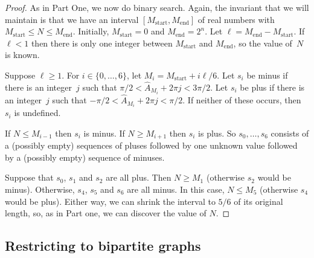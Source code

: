 \documentclass[11pt]{article}
\begin{document}
\begin{proof}
As in Part One, we now do binary search.
Again, the invariant that 
 we will maintain is that we have an interval 
 $[M_{\text{start}},M_{\text{end}}]$ 
 of real numbers
 with $M_{\text{start}} \leq N \leq M_{\text{end}}$.
 Initially, $M_{\text{start}} =  0$ and $M_{\text{end}}=2^n$.
 Let $\ell=M_{\text{end}}-M_{\text{start}}$.
 If $\ell < 1$ then there is only one integer 
 between $M_{\text{start}}$ and $M_{\text{end}}$, so the value of~$N$ is known. 

 Suppose $\ell\geq 1$. 
 For $i\in\{0,\ldots, 6\}$,
 let $M_i = M_{\text{start}} + i \ell/ 6$.
 Let $s_i$ be  minus if 
 there is an integer~$j$ such that 
  $\pi/2 < \hat{A}_{M_i} + 2 \pi j  < 3\pi/2$.
  Let  $s_i$ be plus if 
  there is an integer~$j$ such that
  $-\pi/2 < \hat{A}_{M_i} + 2 \pi j < \pi/2$.
  If neither of these occurs, then $s_i$ is undefined.
 
If $N\leq M_{i-1}$ then $s_i$ is  minus.
If $N\geq  M_{i+1}$ then $s_i$ is  plus.
So $s_0,\ldots,s_6$ consists of a (possibly empty) sequences of  pluses followed by one unknown value
followed by a (possibly empty) sequence of  minuses.

Suppose that  $s_0$, $s_1$ and $s_2$ are all  plus.
Then $N\geq M_1$ (otherwise $s_2$ would be  minus).
Otherwise, $s_4$, $s_5$ and $s_6$ are all minus.
In this case, $N\leq M_5$ (otherwise $s_4$ would be plus). 
Either way, we can shrink the interval to $5/6$ of its original length, so, as in Part one, we can discover the value of $N$.
\end{proof}

\subsection{Restricting to bipartite graphs}\label{sec:MVtobip}
\end{document}
